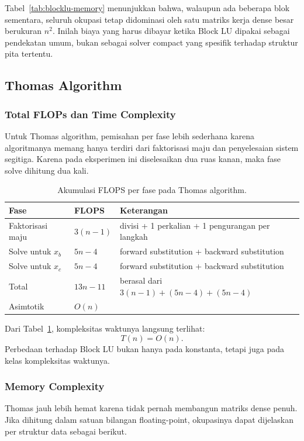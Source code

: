 \documentclass[12pt,a4paper]{article}
\begin{document}
Tabel~\ref{tab:blocklu-memory} menunjukkan bahwa, walaupun ada beberapa blok sementara, seluruh okupasi tetap didominasi oleh satu matriks kerja dense besar berukuran $n^2$. Inilah biaya yang harus dibayar ketika Block LU dipakai sebagai pendekatan umum, bukan sebagai solver compact yang spesifik terhadap struktur pita tertentu.

\subsection{Thomas Algorithm}
\subsubsection*{Total FLOPs dan Time Complexity}
Untuk Thomas algorithm, pemisahan per fase lebih sederhana karena algoritmanya memang hanya terdiri dari faktorisasi maju dan penyelesaian sistem segitiga. Karena pada eksperimen ini diselesaikan dua ruas kanan, maka fase solve dihitung dua kali.

\begin{table}[h]
\centering
\caption{Akumulasi FLOPS per fase pada Thomas algorithm.}
\label{tab:thomas-flops}
\small
\begin{tabularx}{\textwidth}{>{\raggedright\arraybackslash}p{} >{\centering\arraybackslash}p{} >{\raggedright\arraybackslash}X}
\toprule
Fase & FLOPS & Keterangan \\
\midrule
Faktorisasi maju & $3(n-1)$ & 1 divisi + 1 perkalian + 1 pengurangan per langkah \\
Solve untuk $x_b$ & $5n - 4$ & forward substitution + backward substitution \\
Solve untuk $x_c$ & $5n - 4$ & forward substitution + backward substitution \\
\midrule
Total & $13n - 11$ & berasal dari $3(n-1) + (5n-4) + (5n-4)$ \\
Asimtotik & $O(n)$ & \\
\bottomrule
\end{tabularx}
\normalsize
\end{table}

Dari Tabel~\ref{tab:thomas-flops}, kompleksitas waktunya langsung terlihat:
\[
T(n)=O(n).
\]
Perbedaan terhadap Block LU bukan hanya pada konstanta, tetapi juga pada kelas kompleksitas waktunya.

\subsubsection*{Memory Complexity}
Thomas jauh lebih hemat karena tidak pernah membangun matriks dense penuh. Jika dihitung dalam satuan bilangan floating-point, okupasinya dapat dijelaskan per struktur data sebagai berikut.
\end{document}
